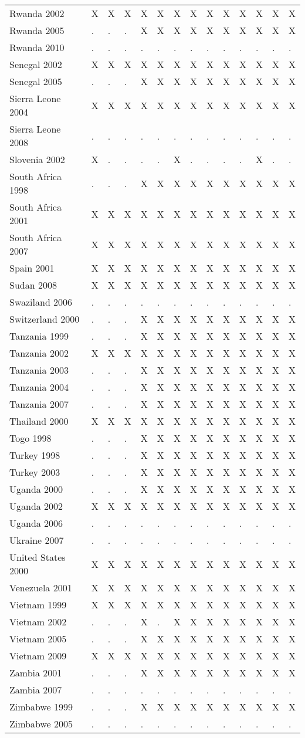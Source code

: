 \documentclass[a4paper]{article}
\begin{document}
\begin{longtable}{llllllllllllll}
Rwanda 2002&X&X&X&X&X&X&X&X&X&X&X&X&X\tabularnewline
Rwanda 2005&.&.&.&X&X&X&X&X&X&X&X&X&X\tabularnewline
Rwanda 2010&.&.&.&.&.&.&.&.&.&.&.&.&.\tabularnewline
Senegal 2002&X&X&X&X&X&X&X&X&X&X&X&X&X\tabularnewline
Senegal 2005&.&.&.&X&X&X&X&X&X&X&X&X&X\tabularnewline
Sierra Leone 2004&X&X&X&X&X&X&X&X&X&X&X&X&X\tabularnewline
Sierra Leone 2008&.&.&.&.&.&.&.&.&.&.&.&.&.\tabularnewline
Slovenia 2002&X&.&.&.&.&X&.&.&.&.&X&.&.\tabularnewline
South Africa 1998&.&.&.&X&X&X&X&X&X&X&X&X&X\tabularnewline
South Africa 2001&X&X&X&X&X&X&X&X&X&X&X&X&X\tabularnewline
South Africa 2007&X&X&X&X&X&X&X&X&X&X&X&X&X\tabularnewline
Spain 2001&X&X&X&X&X&X&X&X&X&X&X&X&X\tabularnewline
Sudan 2008&X&X&X&X&X&X&X&X&X&X&X&X&X\tabularnewline
Swaziland 2006&.&.&.&.&.&.&.&.&.&.&.&.&.\tabularnewline
Switzerland 2000&.&.&.&X&X&X&X&X&X&X&X&X&X\tabularnewline
Tanzania 1999&.&.&.&X&X&X&X&X&X&X&X&X&X\tabularnewline
Tanzania 2002&X&X&X&X&X&X&X&X&X&X&X&X&X\tabularnewline
Tanzania 2003&.&.&.&X&X&X&X&X&X&X&X&X&X\tabularnewline
Tanzania 2004&.&.&.&X&X&X&X&X&X&X&X&X&X\tabularnewline
Tanzania 2007&.&.&.&X&X&X&X&X&X&X&X&X&X\tabularnewline
Thailand 2000&X&X&X&X&X&X&X&X&X&X&X&X&X\tabularnewline
Togo 1998&.&.&.&X&X&X&X&X&X&X&X&X&X\tabularnewline
Turkey 1998&.&.&.&X&X&X&X&X&X&X&X&X&X\tabularnewline
Turkey 2003&.&.&.&X&X&X&X&X&X&X&X&X&X\tabularnewline
Uganda 2000&.&.&.&X&X&X&X&X&X&X&X&X&X\tabularnewline
Uganda 2002&X&X&X&X&X&X&X&X&X&X&X&X&X\tabularnewline
Uganda 2006&.&.&.&.&.&.&.&.&.&.&.&.&.\tabularnewline
Ukraine 2007&.&.&.&.&.&.&.&.&.&.&.&.&.\tabularnewline
United States 2000&X&X&X&X&X&X&X&X&X&X&X&X&X\tabularnewline
Venezuela 2001&X&X&X&X&X&X&X&X&X&X&X&X&X\tabularnewline
Vietnam 1999&X&X&X&X&X&X&X&X&X&X&X&X&X\tabularnewline
Vietnam 2002&.&.&.&X&.&X&X&X&X&X&X&X&X\tabularnewline
Vietnam 2005&.&.&.&X&X&X&X&X&X&X&X&X&X\tabularnewline
\newpage
Vietnam 2009&X&X&X&X&X&X&X&X&X&X&X&X&X\tabularnewline
Zambia 2001&.&.&.&X&X&X&X&X&X&X&X&X&X\tabularnewline
Zambia 2007&.&.&.&.&.&.&.&.&.&.&.&.&.\tabularnewline
Zimbabwe 1999&.&.&.&X&X&X&X&X&X&X&X&X&X\tabularnewline
Zimbabwe 2005&.&.&.&.&.&.&.&.&.&.&.&.&.\tabularnewline
\hline
 \end{longtable}
\end{document}
